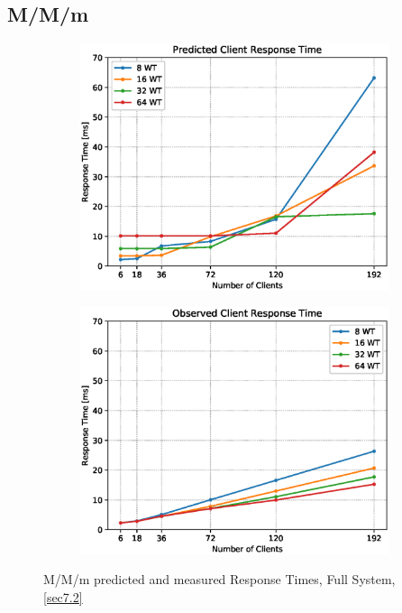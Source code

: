 \documentclass[11pt,a4paper]{article}
\begin{document}
\subsection{M/M/m} \label{sec7.2}



\begin{figure}
    \begin{subfigure}{.5\textwidth}
        \includegraphics[width=1\linewidth]{plots/7_MMm_ResponseTimePredicted.eps}
    \end{subfigure}
    \begin{subfigure}{.5\textwidth}
        \includegraphics[width=1\linewidth]{plots/7_MMm_ResponseTimeObserved.eps}
    \end{subfigure}
    \caption{M/M/m predicted and measured Response Times, Full System, \autoref{sec7.2}}
    \label{fig:mmm-RT}
\end{figure}
\end{document}
